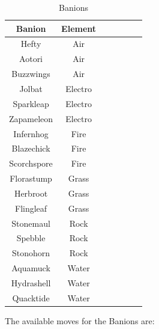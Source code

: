 \documentclass[12pt, a4paper]{report}
\theoremstyle{definition}
\begin{document}
\begin{table}[ht]
    \begin{center}
    \begin{tabular}{| c | c | c | c | c | c | c |}
        \hline
        Banion & Element \\ [0.5ex] %
        \hline\hline
        Hefty & Air \\
        \hline
        Aotori & Air \\
        \hline
        Buzzwings & Air \\
        \hline
        Jolbat & Electro \\
        \hline
        Sparkleap & Electro \\
        \hline
        Zapameleon & Electro \\
        \hline
        Infernhog & Fire \\
        \hline
        Blazechick & Fire \\
        \hline
        Scorchspore & Fire \\
        \hline
        Florastump & Grass \\
        \hline
        Herbroot & Grass \\
        \hline
        Flingleaf & Grass \\
        \hline
        Stonemaul & Rock \\
        \hline
        Spebble & Rock \\
        \hline
        Stonohorn & Rock \\
        \hline
        Aquamuck & Water \\
        \hline
        Hydrashell & Water \\
        \hline
        Quacktide & Water \\
        \hline
    \end{tabular}
    \caption{\label{table:banions} Banions}
    \end{center}
\end{table}

    \pagebreak
    The available moves for the Banions are:
\end{document}
